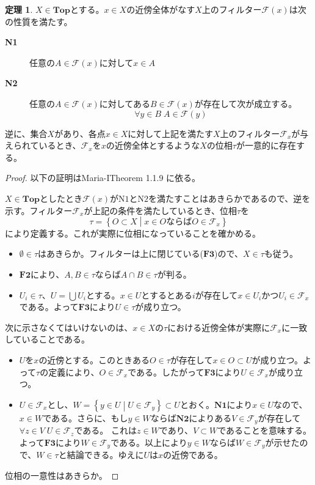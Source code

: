 ﻿\documentclass[12pt]{jsarticle}
\newcommand{\Top}{\textbf{Top}}
\newcommand{\F}{\mathcal{F}}%
\newcommand{\setmid}[2]{\left\{ #1 \mathrel{} \middle| \mathrel{} #2 \right\}}%
\theoremstyle{definition}%
\newtheorem{theorem}[definition]{定理}
\begin{document}
\begin{theorem}
  $X \in \Top$とする。$x \in X$の近傍全体がなす$X$上のフィルター$\F(x)$は次の性質を満たす。
  \begin{description}
    \item[\textbf{N1}] 任意の$A \in \F(x)$に対して$x \in A$
    \item[\textbf{N2}] 任意の$A \in \F(x)$に対してある$B \in \F(x)$が存在して次が成立する。
    \[
    \forall y \in B \; A \in \F(y)
    \]
  \end{description}
  逆に、集合$X$があり、各点$x \in X$に対して上記を満たす$X$上のフィルター$\F_x$が与えられているとき、$\F_x$を$x$の近傍全体とするような$X$の位相$\tau$が一意的に存在する。
\end{theorem}
\begin{proof}
  以下の証明はMaria-I\cite{Maria-I}Theorem 1.1.9 に依る。

  $X \in \Top$としたとき$\F(x)$が$\text{N1}$と$\text{N2}$を満たすことはあきらかであるので、逆を示す。フィルター$\F_x$が上記の条件を満たしているとき、位相$\tau$を
  \[
  \tau = \setmid{O \subset X}{x \in O \text{ならば} O \in \F_x }
  \]
  により定義する。これが実際に位相になっていることを確かめる。
  \begin{itemize}
    \item $\emptyset \in \tau$はあきらか。フィルターは上に閉じている($\textbf{F3}$)ので、$X \in \tau$も従う。
    \item $\textbf{F2}$により、$A,B \in \tau$ならば$A \cap B \in \tau$が判る。
    \item $U_i \in \tau$、$U = \bigcup U_i$とする。$x \in U$とするとある$i$が存在して$x \in U_i$かつ$U_i \in \F_x$である。よって$\textbf{F3}$により$U \in \tau$が成り立つ。
  \end{itemize}
次に示さなくてはいけないのは、$x \in X$の$\tau$における近傍全体が実際に$\F_x$に一致していることである。
\begin{itemize}
\item $U$を$x$の近傍とする。このときある$O \in \tau$が存在して$x \in O \subset U$が成り立つ。よって$\tau$の定義により、$O \in \F_x$である。したがって$\textbf{F3}$により$U \in \F_x$が成り立つ。
\item $U \in \F_x$とし、$W = \setmid{y \in U}{U \in \F_y} \subset U$とおく。$\textbf{N1}$により$x \in U$なので、$x \in W$である。さらに、もし$y \in W$ならば$\textbf{N2}$によりある$V \in \F_y$が存在して$\forall z \in V \; U \in \F_z$である。
これは$z \in W$であり、$V \subset W$であることを意味する。よって$\textbf{F3}$により$W \in \F_y$である。以上により$y \in W$ならば$W \in \F_y $が示せたので、$W \in \tau$と結論できる。ゆえに$U$は$x$の近傍である。
\end{itemize}
位相の一意性はあきらか。
\end{proof}
\end{document}
